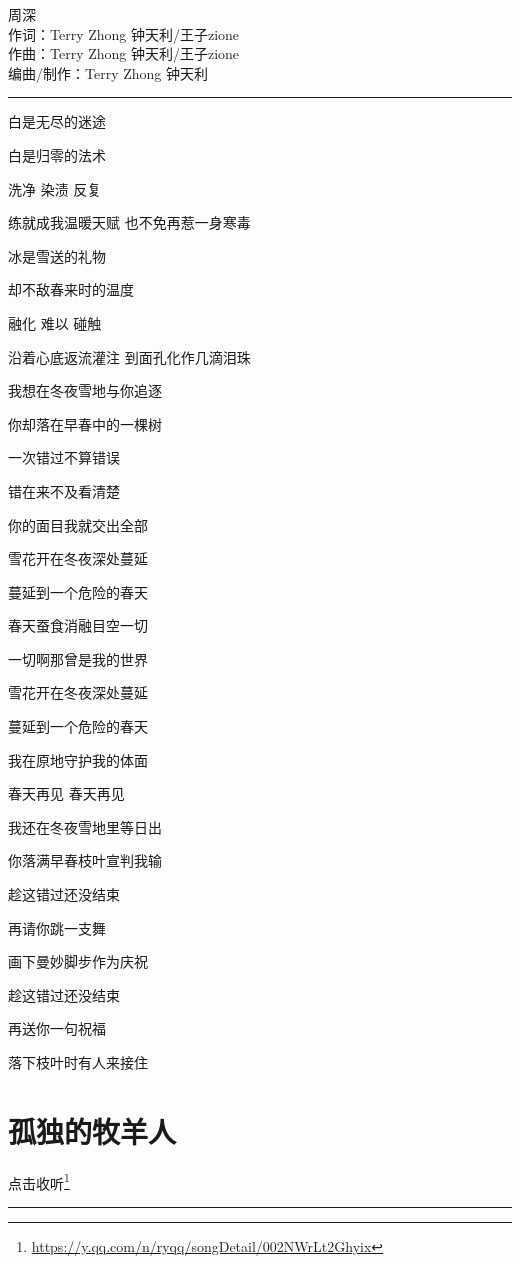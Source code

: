 \documentclass[]{ctexbook}
\renewcommand{\href}[2]{#2\footnote{\url{#1}}}
\begin{document}
周深\\
作词：Terry Zhong 钟天利/王子zione\\
作曲：Terry Zhong 钟天利/王子zione\\
编曲/制作：Terry Zhong 钟天利

\begin{center}\rule{0.5\linewidth}{0.5pt}\end{center}

白是无尽的迷途

白是归零的法术

洗净 染渍 反复

练就成我温暖天赋 也不免再惹一身寒毒

冰是雪送的礼物

却不敌春来时的温度

融化 难以 碰触

沿着心底返流灌注 到面孔化作几滴泪珠

我想在冬夜雪地与你追逐

你却落在早春中的一棵树

一次错过不算错误

错在来不及看清楚

你的面目我就交出全部

雪花开在冬夜深处蔓延

蔓延到一个危险的春天

春天蚕食消融目空一切

一切啊那曾是我的世界

雪花开在冬夜深处蔓延

蔓延到一个危险的春天

我在原地守护我的体面

春天再见 春天再见

我还在冬夜雪地里等日出

你落满早春枝叶宣判我输

趁这错过还没结束

再请你跳一支舞

画下曼妙脚步作为庆祝

趁这错过还没结束

再送你一句祝福

落下枝叶时有人来接住

\section*{孤独的牧羊人}\label{lonely-shepherd}


\href{https://y.qq.com/n/ryqq/songDetail/002NWrLt2Ghyix}{点击收听}

\begin{center}\rule{0.5\linewidth}{0.5pt}\end{center}
\end{document}

